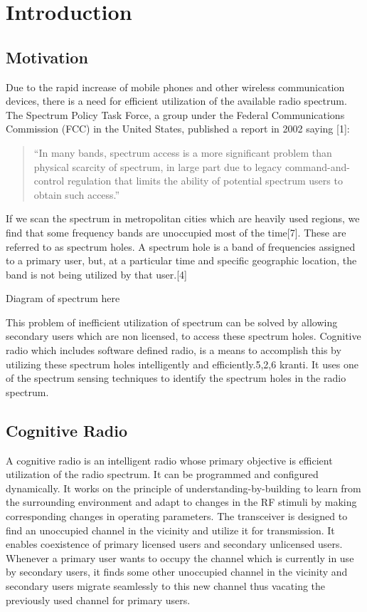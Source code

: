 \chapter{Introduction}

\section{Motivation}
Due to the rapid increase of mobile phones and other wireless communication devices, there is a need for efficient utilization of the available radio spectrum. The Spectrum Policy Task Force, a group under the Federal Communications  Commission (FCC) in the United States, published a report in 2002 saying [1]: 
\begin{quote}
``In many bands, spectrum access is a more significant problem than physical scarcity of spectrum, in large part due to legacy command-and-control regulation that limits the ability of potential spectrum users to obtain such access.''
\end{quote}
If we scan the spectrum in metropolitan cities which are heavily used regions, we find that some frequency bands are unoccupied most of the time[7]. These are referred to as spectrum holes. A spectrum hole is a band of frequencies assigned to a primary user, but, at a particular time and specific geographic location, the band is not being utilized by that user.[4]


Diagram of spectrum here 

This problem of inefficient utilization of spectrum can be solved by allowing secondary users which are non licensed, to access these spectrum holes. Cognitive radio which includes software defined radio, is a means to accomplish this by utilizing these spectrum holes intelligently and efficiently.5,2,6 kranti. It uses one of the spectrum sensing techniques to identify the spectrum holes in the radio spectrum.


\section{Cognitive Radio}
A cognitive radio is an intelligent radio whose primary objective is efficient utilization of the radio spectrum. It can be programmed and configured dynamically. It works on the principle of understanding-by-building to learn from the surrounding environment and adapt to changes in the RF stimuli by making corresponding changes in operating parameters. The transceiver is designed to find an unoccupied channel in the vicinity and utilize it for transmission. It enables coexistence of primary licensed users and secondary unlicensed users. Whenever a primary user wants to occupy the channel which is currently in use by secondary users, it finds some other unoccupied channel in the vicinity and secondary users migrate seamlessly to this new channel thus vacating the previously used channel for primary users.  

